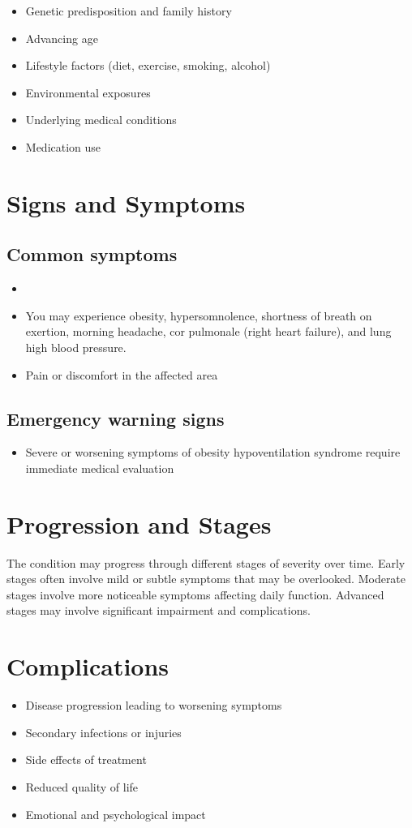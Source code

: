 \begin{itemize}[noitemsep]
  \item Genetic predisposition and family history
  \item Advancing age
  \item Lifestyle factors (diet, exercise, smoking, alcohol)
  \item Environmental exposures
  \item Underlying medical conditions
  \item Medication use
\end{itemize}
\section{Signs and Symptoms}

\subsection{Common symptoms}
\begin{itemize}[noitemsep]
  \item \item You may experience obesity, hypersomnolence, shortness of breath on exertion, morning headache, cor pulmonale (right heart failure), and lung high blood pressure.

  \item Pain or discomfort in the affected area
  \end{itemize}

\subsection{Emergency warning signs}
\begin{itemize}[noitemsep]
  \item Severe or worsening symptoms of obesity hypoventilation syndrome require immediate medical evaluation
\end{itemize}
\section{Progression and Stages}
The condition may progress through different stages of severity over time. Early stages often involve mild or subtle symptoms that may be overlooked. Moderate stages involve more noticeable symptoms affecting daily function. Advanced stages may involve significant impairment and complications.
\section{Complications}
\begin{itemize}[noitemsep]
  \item Disease progression leading to worsening symptoms
  \item Secondary infections or injuries
  \item Side effects of treatment
  \item Reduced quality of life
  \item Emotional and psychological impact
\end{itemize}
